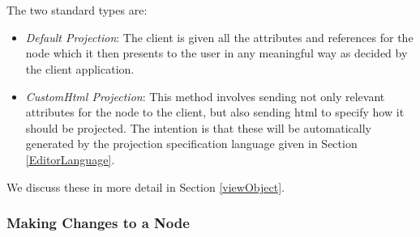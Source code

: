 \documentclass{article}
\begin{document}
\\
\\
The two standard types are:
\begin{itemize}
\item \emph{Default Projection}: The client is given all the attributes and references for the node which it then presents to the user in any meaningful way as decided by the client application.
\item \emph{CustomHtml Projection}: This method involves sending not only relevant attributes for the node to the client, but also sending html to specify how it should be projected. The intention is that these will be automatically generated by the projection specification language given in Section \ref{EditorLanguage}.
\end{itemize}
We discuss these in more detail in Section \ref{viewObject}.
\subsubsection{Making Changes to a Node}
\end{document}
